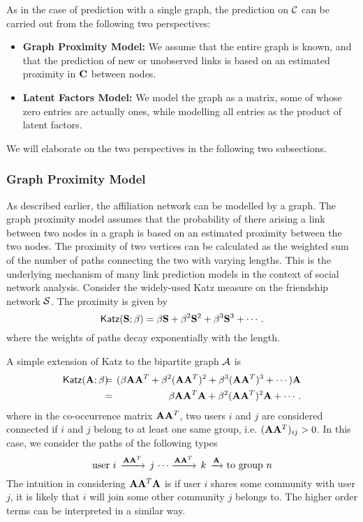 As in the case of prediction with a single graph, the prediction on $\mathcal{C}$ can be carried out from the following two perspectives:
\begin{itemize}
\item {\bf Graph Proximity Model:} We assume that the entire graph is known, and that the prediction of new or unobserved links is based on an estimated proximity in $\mathbf{C}$ between nodes.
\item {\bf Latent Factors Model:} We model the graph as a matrix, some of whose zero entries are actually ones, while modelling all entries as the product of latent factors.
\end{itemize}
We will elaborate on the two perspectives in the following two subsections.

\subsubsection{Graph Proximity Model}
\label{Graph Proximity Model}
As described earlier, the affiliation network can be modelled by a graph. The graph proximity model assumes that the probability of there arising a link between two nodes in a graph is based on an estimated proximity between the two nodes. The proximity of two vertices can be calculated as the weighted sum of the number of paths connecting the two with varying lengths. This is the underlying mechanism of many link prediction models in the context of social network analysis. Consider the widely-used \textsf{Katz} measure\cite{KleinbergLinkPred} on the friendship network $\mathcal{S}$. The proximity is given by
\[
\textsf{Katz}(\mathbf{S}; \beta) = \beta \mathbf{S} + \beta^2 \mathbf{S}^2 + \beta^3 \mathbf{S}^3 + \cdots.
\]
where the weights of paths decay exponentially with the length.

A simple extension of \textsf{Katz} to the bipartite graph $\mathcal{A}$ is
\begin{eqnarray}
\textsf{Katz}(\A; \beta) \hspace{-6pt} &= & \hspace{-6pt}(\beta \A\A^T + \beta^2 (\A\A^T)^2 + \beta^3 (\A\A^T)^3 + \cdots) \A \nonumber \\
\hspace{-6pt} &= & \hspace{-6pt} \beta \A\A^T\A + \beta^2 (\A\A^T)^2\A + \cdots.
\label{e:extKatz}
\end{eqnarray}
where in the co-occurrence matrix $\mathbf{A}\mathbf{A}^T$, two users $i$ and $j$ are considered connected if $i$ and $j$ belong to at least one same group, i.e. $(\mathbf{A}\mathbf{A}^T)_{ij} > 0$. In this case, we consider the paths of the following types
\[
\text{user $i \, \xrightarrow{\mathbf{A}\mathbf{A}^T}\, j \,\cdots \xrightarrow{\mathbf{A}\mathbf{A}^T}\, k \,  \xrightarrow{\mathbf{A}}$ to group $n$}
\]
The intuition in considering $\mathbf{A}\mathbf{A}^T\mathbf{A}$ is if user $i$ shares some community with user $j$, it is likely that $i$ will join some other community $j$ belongs to. The higher order terms can be interpreted in a similar way.

